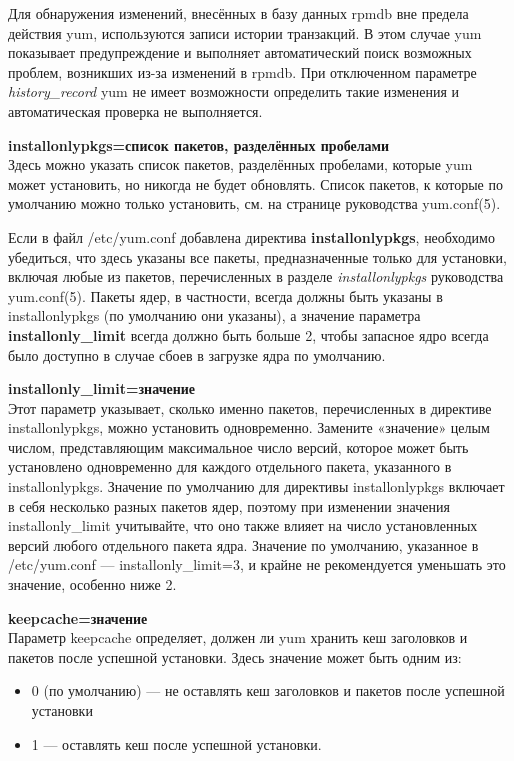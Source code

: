 \documentclass[a4paper,10pt,twoside]{article}
\begin{document}
Для обнаружения изменений, внесённых в базу данных rpmdb вне предела действия yum, используются записи истории транзакций. В этом случае yum показывает предупреждение и выполняет автоматический поиск возможных проблем, возникших из-за изменений в rpmdb. При отключенном параметре \textit{history\_record} yum не имеет возможности определить такие изменения и автоматическая проверка не выполняется.

\textbf{installonlypkgs=список пакетов, разделённых пробелами}\\
Здесь можно указать список пакетов, разделённых пробелами, которые yum может установить, но никогда не будет обновлять. Список пакетов, к которые по умолчанию можно только установить, см. на странице руководства yum.conf(5).

Если в файл /etc/yum.conf добавлена директива \textbf{installonlypkgs}, необходимо убедиться, что здесь указаны все пакеты, предназначенные только для установки, включая любые из  пакетов, перечисленных в разделе \textit{installonlypkgs} руководства yum.conf(5). Пакеты ядер, в частности, всегда должны быть указаны в installonlypkgs (по умолчанию они указаны), а значение параметра \textbf{installonly\_limit} всегда должно быть больше 2, чтобы запасное ядро всегда было доступно в случае сбоев в загрузке ядра по умолчанию.


\textbf{⁠installonly\_limit=значение}\\
Этот параметр указывает, сколько именно пакетов, перечисленных в директиве installonlypkgs, можно установить одновременно. Замените «значение» целым числом, представляющим максимальное число версий, которое может быть установлено одновременно для каждого отдельного пакета, указанного в installonlypkgs. Значение по умолчанию для директивы installonlypkgs включает в себя несколько разных пакетов ядер, поэтому при изменении значения installonly\_limit учитывайте, что оно также влияет на число установленных версий любого отдельного пакета ядра. Значение по умолчанию, указанное в /etc/yum.conf — installonly\_limit=3, и крайне не рекомендуется уменьшать это значение, особенно ниже 2.


\textbf{keepcache=значение}\\
Параметр keepcache определяет, должен ли yum хранить кеш заголовков и пакетов после успешной установки. Здесь значение может быть одним из:
\begin{itemize}
 \item 0 (по умолчанию) — не оставлять кеш заголовков и пакетов после успешной установки
\item 1 — оставлять кеш после успешной установки.
\end{itemize}
\end{document}
